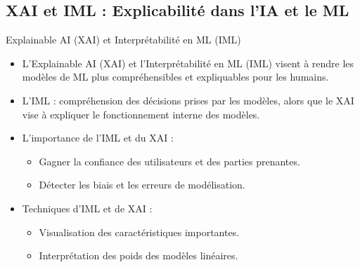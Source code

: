 \documentclass{beamer}
\begin{document}
\subsection{XAI et IML : Explicabilité dans l'IA et le ML}	
\begin{frame}{Explainable AI (XAI) et Interprétabilité en ML (IML)}
	\begin{itemize}
		\item L'Explainable AI (XAI) et l'Interprétabilité en ML (IML) visent à rendre les modèles de ML plus compréhensibles et expliquables pour les humains.
		\item L'IML : compréhension des décisions prises par les modèles, alors que le XAI vise à expliquer le fonctionnement interne des modèles.
		\item L'importance de l'IML et du XAI :
		\begin{itemize}
			\item Gagner la confiance des utilisateurs et des parties prenantes.
			\item Détecter les biais et les erreurs de modélisation.
		\end{itemize}
		\item Techniques d'IML et de XAI :
		\begin{itemize}
			\item Visualisation des caractéristiques importantes.
			\item Interprétation des poids des modèles linéaires.
		\end{itemize}
	\end{itemize}
\end{frame}
	
\end{document}
